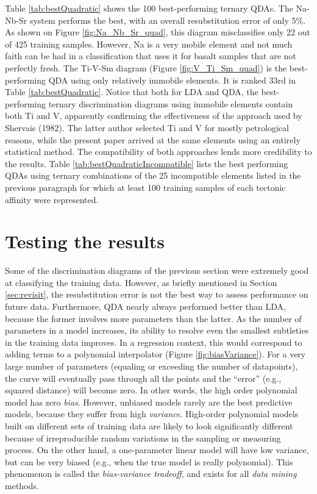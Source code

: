 \documentclass{article}
\begin{document}
Table  \ref{tab:bestQuadratic} shows  the 100  best-performing ternary
QDAs.   The  Na-Nb-Sr  system  performs  the  best,  with  an  overall
resubstitution   error   of   only    5\%.    As   shown   on   Figure
\ref{fig:Na_Nb_Sr_quad}, this diagram misclassifies only 22 out of 425
training samples.  However,  Na is a very mobile  element and not much
faith can be  had in a classification that uses  it for basalt samples
that   are  not   perfectly  fresh.    The  Ti-V-Sm   diagram  (Figure
\ref{fig:V_Ti_Sm_quad})   is  the   best-performing  QDA   using  only
relatively   immobile  elements.    It   is  ranked   33rd  in   Table
\ref{tab:bestQuadratic}.   Notice  that  both  for LDA  and  QDA,  the
best-performing   ternary  discrimination   diagrams   using  immobile
elements   contain  both   Ti   and  V,   apparently  confirming   the
effectiveness  of the approach  used by  Shervais (1982).   The latter
author selected  Ti and V  for mostly petrological reasons,  while the
present  paper  arrived  at   the  same  elements  using  an  entirely
statistical method.   The compatibility of both  approaches lends more
credibility to  the results. Table \ref{tab:bestQuadraticIncompatible}
lists the  best performing QDAs  using ternary combinations of  the 25
incompatible elements  listed in the  previous paragraph for  which at
least 100 training samples of each tectonic affinity were represented.

\section{Testing the results} \label{sec:test}

Some  of the  discrimination  diagrams of  the  previous section  were
extremely good at classifying  the training data.  However, as briefly
mentioned  in Section \ref{sec:revisit},  the resubstitution  error is
not the best  way to assess performance on  future data.  Furthermore,
QDA  nearly  always performed  better  than  LDA,  because the  former
involves more parameters than the latter.  As the number of parameters
in  a  model increases,  its  ability  to  resolve even  the  smallest
subtleties in  the training data  improves.  In a  regression context,
this  would correspond to  adding terms  to a  polynomial interpolator
(Figure   \ref{fig:biasVariance}).   For  a   very  large   number  of
parameters (equaling or exceeding the number of datapoints), the curve
will eventually pass  through all the points and  the ``error'' (e.g.,
squared distance)  will become zero.   In other words, the  high order
polynomial model has zero {\it bias}.  However, unbiased models rarely
are the  best predictive  models, because they  suffer from  high {\it
variance}.  High-order  polynomial models  built on different  sets of
training data  are likely to  look significantly different  because of
irreproducible random variations in the sampling or measuring process.
On  the  other  hand,  a  one-parameter linear  model  will  have  low
variance, but can be very biased  (e.g., when the true model is really
polynomial).   This  phenomenon   is  called  the  {\it  bias-variance
tradeoff}, and exists for all {\it data mining} methods.\\
\end{document}
